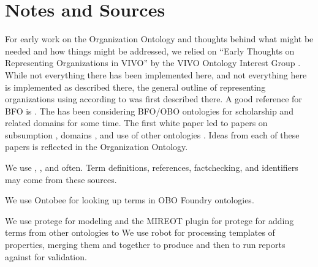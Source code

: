 \documentclass[letterpaper,10pt,english]{sphinxmanual}
\begin{document}
\chapter{Notes and Sources}
\label{\detokenize{notes-and-sources:notes-and-sources}}\label{\detokenize{notes-and-sources::doc}}
\sphinxAtStartPar
For early work on the Organization Ontology and thoughts behind what might be
needed and how things might be addressed, we relied on “Early Thoughts on
Representing Organizations in VIVO” by the VIVO Ontology Interest Group
.  While not everything there has been implemented here, and not
everything here is implemented as described there, the general outline of
representing organizations using  according to  was first described
there. A good reference for BFO is .  The  has been
considering BFO/OBO ontologies for scholarship and related domains for some
time. The first white paper  led to papers on subsumption ,
domains , and use of other ontologies .  Ideas from each of
these papers is reflected in the Organization Ontology.

\sphinxAtStartPar
We use , , and  often.  Term definitions,
references, fact\sphinxhyphen{}checking, and identifiers may come from these sources.

\sphinxAtStartPar
We use Ontobee  for looking up terms in OBO Foundry ontologies.

\sphinxAtStartPar
We use protege  for modeling  and the MIREOT plug\sphinxhyphen{}in for
protege  for
adding terms from other ontologies to   We use robot  for
processing templates of properties, merging them and  together to
produce  and then to run reports against  for validation.
\end{document}

